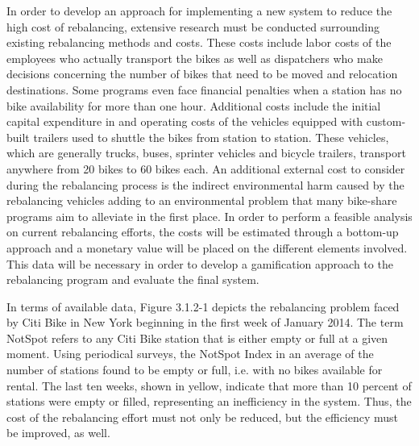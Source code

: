 \documentclass{sig-alternate}
\begin{document}
In order to develop an approach for implementing a new system to reduce the high cost of rebalancing, extensive research must be conducted surrounding existing rebalancing methods and costs. These costs include labor costs of the employees who actually transport the bikes as well as dispatchers who make decisions concerning the number of bikes that need to be moved and relocation destinations. Some programs even face financial penalties when a station has no bike availability for more than one hour. Additional costs include the initial capital expenditure in and operating costs of the vehicles equipped with custom-built trailers used to shuttle the bikes from station to station. These vehicles, which are generally trucks, buses, sprinter vehicles and bicycle trailers, transport anywhere from 20 bikes to 60 bikes each. An additional external cost to consider during the rebalancing process is the indirect environmental harm caused by the rebalancing vehicles adding to an environmental problem that many bike-share programs aim to alleviate in the first place. In order to perform a feasible analysis on current rebalancing efforts, the costs will be estimated through a bottom-up approach and a monetary value will be placed on the different elements involved. This data will be necessary in order to develop a gamification approach to the rebalancing program and evaluate the final system. \newline

In terms of available data, Figure 3.1.2-1 depicts the rebalancing problem faced by Citi Bike in New York beginning in the first week of January 2014. The term NotSpot refers to any Citi Bike station that is either empty or full at a given moment. Using periodical surveys, the NotSpot Index in an average of the number of stations found to be empty or full, i.e. with no bikes available for rental. The last ten weeks, shown in yellow, indicate that more than 10 percent of stations were empty or filled, representing an inefficiency in the system. Thus, the cost of the rebalancing effort must not only be reduced, but the efficiency must be improved, as well. \newline
\end{document}

